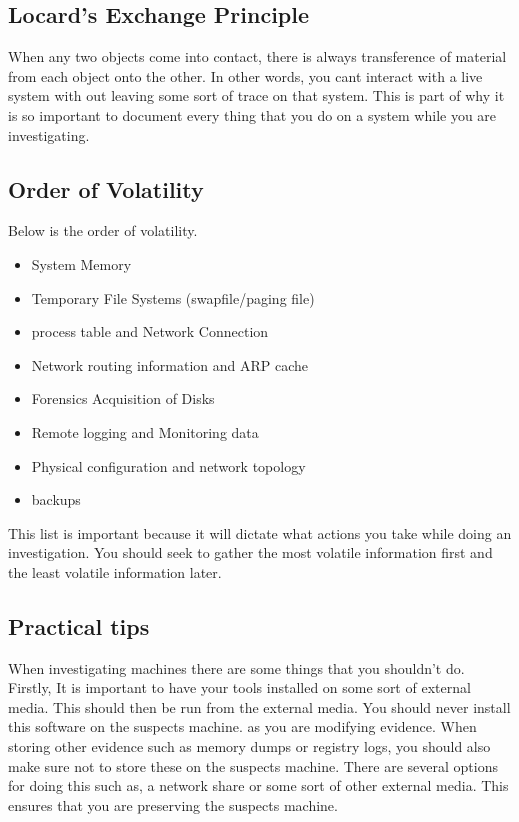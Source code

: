 \documentclass[letterpaper, onecolumn,10pt]{IEEEtran}
\begin{document}
            \subsection{Locard's Exchange Principle} When any two objects come into contact, there is always transference of material from each object onto the other. In other words, you cant interact with a live system with out leaving some sort of trace on that system. This is part of why it is so important to document every thing that you do on a system while you are investigating.
            
            \subsection{Order of Volatility} Below is the order of volatility.
            \begin{itemize}
                \item System Memory
                \item Temporary File Systems (swapfile/paging file)
                \item process table and Network Connection
                \item Network routing information and ARP cache
                \item Forensics Acquisition of Disks
                \item Remote logging and Monitoring data
                \item Physical configuration and network topology
                \item backups
            \end{itemize}
            This list is important because it will dictate what actions you take while doing an investigation. You should seek to gather the most volatile information first and the least volatile information later.\\
            
            \subsection{Practical tips} When investigating machines there are some things that you shouldn't do. Firstly, It is important to have your tools installed on some sort of external media. This should then be run from the external media. You should never install this software on the suspects machine. as you are modifying evidence. When storing other evidence such as memory dumps or registry logs, you should also make sure not to store these on the suspects machine. There are several options for doing this such as, a network share or some sort of other external media. This ensures that you are preserving the suspects machine.\\
            
\end{document}
